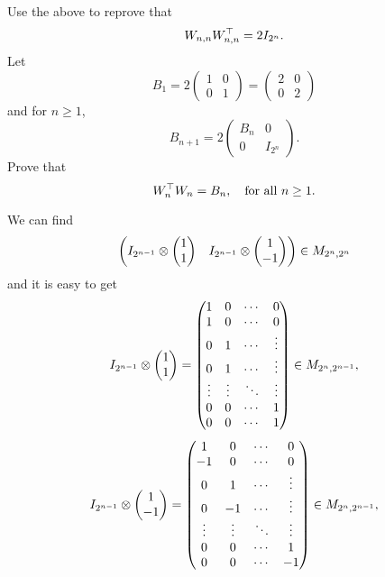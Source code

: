 \documentclass[12pt]{article}
\begin{document}
\medskip
Use the above to reprove that
\[
W_{n, n}W_{n, n}^{\top} = 2I_{2^n}.
\]
Let
\[
B_1 =
2
\begin{pmatrix}
1 & 0 \\
0 & 1
\end{pmatrix}
= 
\begin{pmatrix}
2 & 0 \\
0 & 2
\end{pmatrix}
\]
and for $n \geq 1$,
\[
B_{n+1} =
2
\begin{pmatrix}
B_n & 0 \\
0 & I_{2^n}
\end{pmatrix}.
\]
Prove that
\[
W_n^{\top} W_n = B_n, \quad\hbox{for all $n \geq 1$}.
\]


We can find \[
\begin{pmatrix}
I_{2^{n-1}} \otimes 
\begin{pmatrix}
1 \\
1
\end{pmatrix}
& 
I_{2^{n-1}} \otimes 
\begin{pmatrix}
1 \\
-1
\end{pmatrix}
\end{pmatrix} \in M_{2^n,2^n}
\] 
and it is easy to get 
\[
I_{2^{n-1}} \otimes 
\begin{pmatrix}
1 \\
1
\end{pmatrix}
=
\begin{pmatrix}
1 & 0 & \cdots & 0 \\
1 & 0 & \cdots & 0 \\
0 & 1 & \cdots & \vdots \\
0 & 1 & \cdots & \vdots \\
\vdots  & \vdots & \ddots & \vdots \\
0 & 0 & \cdots &1 \\
0 & 0 & \cdots &1 \\
\end{pmatrix} 
\in M_{2^n, 2^{n-1}},
\]
\[
I_{2^{n-1}} \otimes 
\begin{pmatrix}
1 \\
-1
\end{pmatrix}
=
\begin{pmatrix}
1 & 0 & \cdots & 0 \\
-1 & 0 & \cdots & 0 \\
0 & 1 & \cdots & \vdots \\
0 & -1 & \cdots & \vdots \\
\vdots  & \vdots & \ddots & \vdots \\
0 & 0 & \cdots &1 \\
0 & 0 & \cdots &-1 \\
\end{pmatrix} 
\in M_{2^n, 2^{n-1}},
\]
\end{document}
